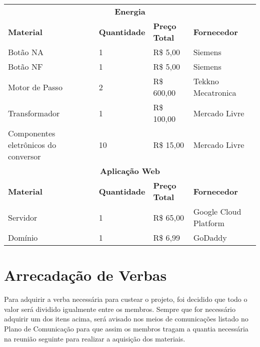 \begin{table}[]
\begin{tabular}{lllll}
\multicolumn{5}{c}{\textbf{Energia}}                                                                                          \\
\textbf{Material}                    & \textbf{Quantidade} & \textbf{Preço Total} & \multicolumn{2}{l}{\textbf{Fornecedor}}   \\
Botão NA                             & 1                   & R\$ 5,00             & \multicolumn{2}{l}{Siemens}               \\
Botão NF                             & 1                   & R\$ 5,00             & \multicolumn{2}{l}{Siemens}               \\
Motor de Passo                       & 2                   & R\$ 600,00           & \multicolumn{2}{l}{Tekkno Mecatronica}    \\
Transformador                        & 1                   & R\$ 100,00           & \multicolumn{2}{l}{Mercado Livre}         \\
Componentes eletrônicos do conversor & 10                  & R\$ 15,00            & \multicolumn{2}{l}{Mercado Livre}         \\
\multicolumn{5}{c}{\textbf{Aplicação Web}}                                                                                    \\
\textbf{Material}                    & \textbf{Quantidade} & \textbf{Preço Total} & \multicolumn{2}{l}{\textbf{Fornecedor}}   \\
Servidor                             & 1                   & R\$ 65,00            & \multicolumn{2}{l}{Google Cloud Platform} \\
Domínio                              & 1                   & R\$ 6,99             & \multicolumn{2}{l}{GoDaddy}              
\end{tabular}
\end{table}

\section{Arrecadação de Verbas}
Para adquirir a verba necessária para custear o projeto, foi decidido que todo o valor será dividido igualmente entre os membros. Sempre que for necessário adquirir um dos itens acima, será avisado nos meios de comunicações listado no Plano de Comunicação para que assim os membros tragam a quantia necessária na reunião seguinte para realizar a aquisição dos materiais.
